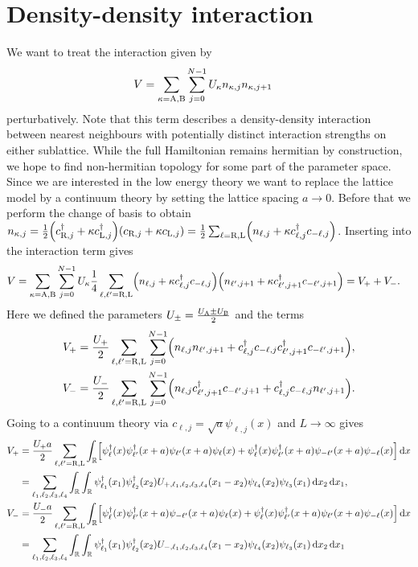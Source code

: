 \documentclass[english, parskip=full]{scrartcl}
\begin{document}
\section{Density-density interaction}
We want to treat the interaction given by
\begin{align}
V &= \sum_{\kappa=\text{A},\text{B}} \sum_{j=0}^{N-1} U_\kappa n_{\kappa,j} n_{\kappa,j+1}
\end{align}
perturbatively.
Note that this term describes a density-density interaction between nearest neighbours with potentially distinct interaction strengths on either sublattice.
While the full Hamiltonian remains hermitian by construction, we hope to find non-hermitian topology for some part of the parameter space.
Since we are interested in the low energy theory we want to replace the lattice model by a continuum theory by setting the lattice spacing $a\rightarrow 0$.
Before that we perform the change of basis to obtain $n_{\kappa,j} = \frac{1}{2} \kla*{c_{\R,j}^\dagger + \kappa c_{\L,j}^\dagger} \kla*{c_{\R,j} + \kappa c_{\L,j}} = \frac{1}{2} \sum_{\ell=\R,\L} \kla*{n_{\ell,j} + \kappa c_{\ell,j}^\dagger c_{-\ell,j}}$.
Inserting into the interaction term gives
\begin{align}
V &= \sum_{\kappa=\A,\B} \sum_{j=0}^{N-1} U_\kappa \frac{1}{4} \sum_{\ell,\ell'=\R,\L} \kla*{n_{\ell,j} + \kappa c_{\ell,j}^\dagger c_{-\ell,j}} \kla*{n_{\ell',j+1} + \kappa c_{\ell',j+1}^\dagger c_{-\ell',j+1}} = V_+ + V_-.
\end{align}
Here we defined the parameters $U_\pm = \frac{U_{\text{A}} \pm U_{\text{B}}}{2}$ and the terms
\begin{align}
V_+ &= \frac{U_+}{2} \sum_{\ell,\ell'=\R,\L} \sum_{j=0}^{N-1} \kla*{n_{\ell,j} n_{\ell',j+1} + c_{\ell,j}^\dagger c_{-\ell,j} c_{\ell',j+1}^\dagger c_{-\ell',j+1}},\\
V_- &= \frac{U_-}{2} \sum_{\ell,\ell'=\R,\L} \sum_{j=0}^{N-1} \kla*{n_{\ell,j} c_{\ell',j+1}^\dagger c_{-\ell',j+1} + c_{\ell,j}^\dagger c_{-\ell,j} n_{\ell',j+1}}.
\end{align}
Going to a continuum theory via $c_{\ell,j}=\sqrt{a} \psi_{\ell,j}(x)$ and $L\rightarrow\infty$ gives
\begin{align}
V_+ &= \frac{U_+ a}{2} \sum_{\ell,\ell'=\R,\L} \intr{\klb*{\psi_{\ell}^\dagger(x) \psi_{\ell'}^\dagger(x+a) \psi_{\ell'}(x+a) \psi_{\ell}(x) + \psi_{\ell}^\dagger(x) \psi_{\ell'}^\dagger(x+a) \psi_{-\ell'}(x+a) \psi_{-\ell}(x)}}{x}\\
&= \sum_{\ell_1,\ell_2,\ell_3,\ell_4} \intr{\intr{\psi_{\ell_1}^\dagger(x_1) \psi_{\ell_2}^\dagger(x_2) U_{+,\ell_1,\ell_2,\ell_3,\ell_4}(x_1-x_2) \psi_{\ell_4}(x_2) \psi_{\ell_3}(x_1)}{x_2}}{x_1},\\
V_- &= \frac{U_- a}{2} \sum_{\ell,\ell'=\R,\L} \intr{\klb*{\psi_{\ell}^\dagger(x) \psi_{\ell'}^\dagger(x+a) \psi_{-\ell'}(x+a) \psi_{\ell}(x) + \psi_{\ell}^\dagger(x) \psi_{\ell'}^\dagger(x+a) \psi_{\ell'}(x+a) \psi_{-\ell}(x)}}{x}\\
&= \sum_{\ell_1,\ell_2,\ell_3,\ell_4} \intr{\intr{\psi_{\ell_1}^\dagger(x_1) \psi_{\ell_2}^\dagger(x_2) U_{-,\ell_1,\ell_2,\ell_3,\ell_4}(x_1-x_2) \psi_{\ell_4}(x_2) \psi_{\ell_3}(x_1)}{x_2}}{x_1}
\end{align}
\end{document}
